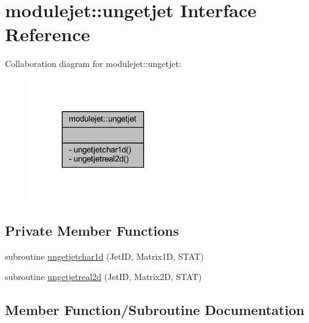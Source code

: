 \hypertarget{interfacemodulejet_1_1ungetjet}{}\section{modulejet\+:\+:ungetjet Interface Reference}
\label{interfacemodulejet_1_1ungetjet}


Collaboration diagram for modulejet\+:\+:ungetjet\+:\nopagebreak
\begin{figure}[H]
\begin{center}
\leavevmode
\includegraphics[width=179pt]{interfacemodulejet_1_1ungetjet__coll__graph}
\end{center}
\end{figure}
\subsection*{Private Member Functions}
\begin{DoxyCompactItemize}
\item 
subroutine \mbox{\hyperlink{interfacemodulejet_1_1ungetjet_acfcd74c3e766524167ad376295ca0a4e}{ungetjetchar1d}} (Jet\+ID, Matrix1D, S\+T\+AT)
\item 
subroutine \mbox{\hyperlink{interfacemodulejet_1_1ungetjet_a164d95daa5778f7867b70271bf4f37f5}{ungetjetreal2d}} (Jet\+ID, Matrix2D, S\+T\+AT)
\end{DoxyCompactItemize}


\subsection{Member Function/\+Subroutine Documentation}
\mbox{\label{interfacemodulejet_1_1ungetjet_acfcd74c3e766524167ad376295ca0a4e}} 
